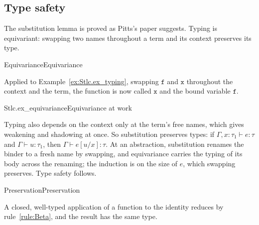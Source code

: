 \documentclass{article}
\begin{document}
\subsection{Type safety}

The substitution lemma is proved as Pitts's paper suggests. Typing is
equivariant: swapping two names throughout a term and its context preserves
its type.

\begin{leantheorem}[sum=T-GyIH9gSH]{Equivariance}{Equivariance}
\label{thm:Equivariance}
\end{leantheorem}

Applied to Example~\ref{ex:Stlc.ex_typing}, swapping $\mathtt{f}$ and
$\mathtt{x}$ throughout the context and the term, the function is now called
$\mathtt{x}$ and the bound variable $\mathtt{f}$.

\begin{leanexample}[sum=Ab7S8d4Yhx]{Stlc.ex_equivariance}{Equivariance at work}
\label{ex:Stlc.ex_equivariance}
\end{leanexample}

Typing also depends on the context only at the term's free names, which
gives weakening and shadowing at once. So
substitution preserves types: if $\Gamma, x{:}\tau_1 \vdash e : \tau$ and
$\Gamma \vdash u : \tau_1$, then $\Gamma \vdash e[u/x] : \tau$. At an
abstraction, substitution renames the binder to a fresh name by swapping, and
equivariance carries the typing of its body across the renaming; the
induction is on the size of $e$, which swapping
preserves. Type safety follows.

\begin{leantheorem}[sum=VQLUk38uFC]{Preservation}{Preservation}
\label{thm:Preservation}
\end{leantheorem}

A closed, well-typed application of a function to the identity reduces by
rule~\ref{rule:Beta}, and the result has the same type.
\end{document}
